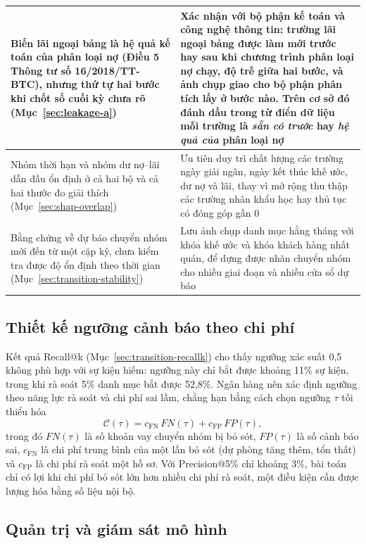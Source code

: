 \begin{longtable}{|p{6.0cm}|p{7.4cm}|}
\hline
Biến lãi ngoại bảng là hệ quả kế toán của phân loại nợ (Điều 5 Thông tư số 16/2018/TT-BTC), nhưng thứ tự hai bước khi chốt số cuối kỳ chưa rõ (Mục~\ref{sec:leakage-a}) & Xác nhận với bộ phận kế toán và công nghệ thông tin: trường lãi ngoại bảng được làm mới trước hay sau khi chương trình phân loại nợ chạy, độ trễ giữa hai bước, và ảnh chụp giao cho bộ phận phân tích lấy ở bước nào. Trên cơ sở đó đánh dấu trong từ điển dữ liệu mỗi trường là \emph{sẵn có trước} hay \emph{hệ quả của} phân loại nợ\\
\hline
Nhóm thời hạn và nhóm dư nợ--lãi dẫn đầu ổn định ở cả hai bộ và cả hai thước đo giải thích (Mục~\ref{sec:shap-overlap}) & Ưu tiên duy trì chất lượng các trường ngày giải ngân, ngày kết thúc khế ước, dư nợ và lãi, thay vì mở rộng thu thập các trường nhân khẩu học hay thủ tục có đóng góp gần 0\\
\hline
Bằng chứng về dự báo chuyển nhóm mới đến từ một cặp kỳ, chưa kiểm tra được độ ổn định theo thời gian (Mục~\ref{sec:transition-stability}) & Lưu ảnh chụp danh mục hằng tháng với khóa khế ước và khóa khách hàng nhất quán, để dựng được nhãn chuyển nhóm cho nhiều giai đoạn và nhiều cửa sổ dự báo\\
\hline
\end{longtable}

\subsection{Thiết kế ngưỡng cảnh báo theo chi phí}
\label{sec:recommend-cost}

Kết quả Recall@k (Mục~\ref{sec:transition-recallk}) cho thấy ngưỡng xác suất 0,5 không phù hợp với sự kiện hiếm: ngưỡng này chỉ bắt được khoảng 11\% sự kiện, trong khi rà soát 5\% danh mục bắt được 52,8\%. Ngân hàng nên xác định ngưỡng theo năng lực rà soát và chi phí sai lầm, chẳng hạn bằng cách chọn ngưỡng $\tau$ tối thiểu hóa
\[
\mathcal{C}(\tau)=c_{\mathrm{FN}}\,FN(\tau)+c_{\mathrm{FP}}\,FP(\tau),
\]
trong đó $FN(\tau)$ là số khoản vay chuyển nhóm bị bỏ sót, $FP(\tau)$ là số cảnh báo sai, $c_{\mathrm{FN}}$ là chi phí trung bình của một lần bỏ sót (dự phòng tăng thêm, tổn thất) và $c_{\mathrm{FP}}$ là chi phí rà soát một hồ sơ. Với Precision@5\% chỉ khoảng 3\%, bài toán chỉ có lợi khi chi phí bỏ sót lớn hơn nhiều chi phí rà soát, một điều kiện cần được lượng hóa bằng số liệu nội bộ.

\subsection{Quản trị và giám sát mô hình}
\label{sec:recommend-governance}

